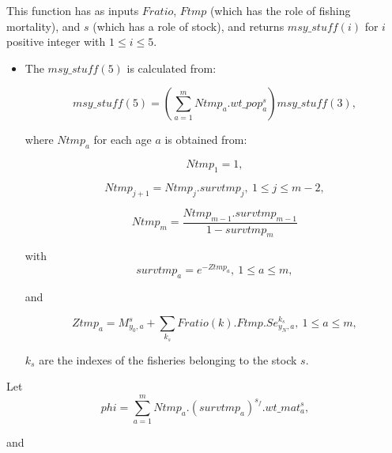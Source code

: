 \documentclass{article}
\begin{document}
This function has as inputs $Fratio$, $Ftmp$ (which has the role of fishing mortality), and $s$ (which has a role of stock), and returns $msy\_stuff(i)$ for $i$ positive integer with $1\leq i \leq 5$.
\begin{itemize}

\item The $msy\_stuff(5)$ %
is calculated from:

\begin{equation}
    msy\_stuff(5) = \left(\sum_{a=1}^m Ntmp_a . wt\_pop^s_a\right) msy\_stuff(3),
\end{equation}

where $Ntmp_a$ for each age $a$ is obtained from:

\begin{equation}
    Ntmp_1=1,
\end{equation}

\begin{equation}
    Ntmp_{j+1} = Ntmp_j . survtmp_j, \ 1\leq j \leq m-2,
\end{equation}

\begin{equation}
    Ntmp_m=\dfrac{Ntmp_{m-1} . survtmp_{m-1}}{1-survtmp_m}
\end{equation}

with
\begin{equation}
    survtmp_a = e^{-Ztmp_a}, \ 1\leq a \leq m,
\end{equation}

and

\begin{equation}
    Ztmp_a=M^s_{y_0,a}+\sum_{k_s}Fratio(k). Ftmp .Se^{k_s}_{y_N,a}, \ 1\leq a \leq m, 
\end{equation}

$k_s$ are the indexes of the fisheries belonging to the stock $s$.\\
\end{itemize}
Let 
\begin{equation}
    phi= \sum_{a=1}^m Ntmp_a .(survtmp_a)^{s_f} . wt\_mat^s_a,
\end{equation}

and 
\end{document}
